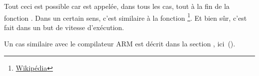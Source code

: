 \newcommand{\URLSJ}{\href{http://en.wikipedia.org/wiki/Setjmp.h}{Wikipédia}}

Tout ceci est possible car \printf est appelée, dans tous les cas, tout à la fin
de la fonction \ttf.
Dans un certain sens, c'est similaire à la fonction \footnote{\URLSJ}.
Et bien sûr, c'est fait dans un but de vitesse d'exécution.

Un cas similaire avec le compilateur ARM est décrit dans la section \q{\PrintfSeveralArgumentsSectionName},
ici~().



